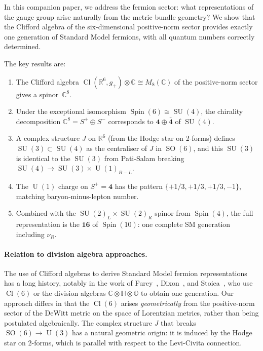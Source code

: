 \documentclass[12pt,a4paper]{article}
\theoremstyle{definition}
\newcommand{\SO}{\operatorname{SO}}
\newcommand{\SU}{\operatorname{SU}}
\newcommand{\U}{\operatorname{U}}
\newcommand{\Spin}{\operatorname{Spin}}
\newcommand{\Cl}{\operatorname{Cl}}
\newcommand{\R}{\mathbb{R}}
\newcommand{\C}{\mathbb{C}}
\begin{document}
In this companion paper, we address the fermion sector: what representations of the gauge group arise naturally from the metric bundle geometry?
We show that the Clifford algebra of the six-dimensional positive-norm sector provides exactly one generation of Standard Model fermions, with all quantum numbers correctly determined.

The key results are:
\begin{enumerate}[nosep]
\item The Clifford algebra $\Cl(\R^6, g_+) \otimes \C \cong M_8(\C)$ of the positive-norm sector gives a spinor~$\C^8$.
\item Under the exceptional isomorphism $\Spin(6) \cong \SU(4)$, the chirality decomposition $\C^8 = S^+ \oplus S^-$ corresponds to $\mathbf{4} \oplus \bar{\mathbf{4}}$ of $\SU(4)$.
\item A complex structure $J$ on $\R^6$ (from the Hodge star on 2-forms) defines $\SU(3) \subset \SU(4)$ as the centraliser of $J$ in $\SO(6)$, and this $\SU(3)$ is identical to the $\SU(3)$ from Pati-Salam breaking $\SU(4) \to \SU(3) \times \U(1)_{B-L}$.
\item The $\U(1)$ charge on $S^+ = \mathbf{4}$ has the pattern $\{+1/3, +1/3, +1/3, -1\}$, matching baryon-minus-lepton number.
\item Combined with the $\SU(2)_L \times \SU(2)_R$ spinor from $\Spin(4)$, the full representation is the $\mathbf{16}$ of $\Spin(10)$: one complete SM generation including $\nu_R$.
\end{enumerate}

\paragraph{Relation to division algebra approaches.}
The use of Clifford algebras to derive Standard Model fermion representations has a long history, notably in the work of Furey~\cite{Furey2016,Furey2018}, Dixon~\cite{Dixon1994}, and Stoica~\cite{Stoica2018}, who use $\Cl(6)$ or the division algebras $\C \otimes \mathbb{H} \otimes \mathbb{O}$ to obtain one generation.
Our approach differs in that the $\Cl(6)$ arises \emph{geometrically} from the positive-norm sector of the DeWitt metric on the space of Lorentzian metrics, rather than being postulated algebraically.
The complex structure $J$ that breaks $\SO(6) \to \U(3)$ has a natural geometric origin: it is induced by the Hodge star on 2-forms, which is parallel with respect to the Levi-Civita connection.


\end{document}
